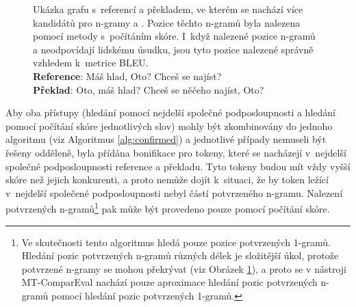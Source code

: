 \begin{figure}[h!]

	\caption{
		Ukázka grafu s~referencí a překladem, ve kterém se nachází více kandidátů pro \mbox{n-gramy}  a \uv{,}.
		Pozice těchto \mbox{n-gramů} byla nalezena pomocí metody s~počítáním skóre.
		I~když nalezené pozice \mbox{n-gramů}  a \uv{,} neodpovídají lidskému úsudku,
		jsou tyto pozice nalezené správně vzhledem k~metrice BLEU. \\
		\textbf{Reference}: Máš hlad, Oto? Chceš se najíst?\\
		\textbf{Překlad}: Oto, máš hlad? Chceš se něčeho najíst, Oto?
	}
	\label{img:graph-6}
\end{figure}
  
Aby oba přístupy (hledání pomocí nejdelší společné podposloupnosti a hledání pomocí počítání skóre jednotlivých slov) mohly být zkombinovány do jednoho algoritmu (viz Algoritmus \ref{alg:confirmed}) a
  jednotlivé případy nemuseli být řešeny odděleně,
  byla přídána bonifikace pro tokeny,
  které se nacházejí v~nejdelší společné podposloupnosti reference a překladu.
Tyto tokeny budou mít vždy vyšší skóre než jejich konkurenti,
  a proto nemůže dojít k~situaci,
  že by token ležící v~nejdelší společené podposloupnosti nebyl částí potvrzeného \mbox{n-gramu}.
Nalezení potvrzených \mbox{n-gramů}\footnote{
  Ve skutečnosti tento algoritmus hledá pouze pozice potvrzených \mbox{1-gramů}.
  Hledání pozic potvrzených \mbox{n-gramů} různých délek je složitější úkol, protože potvrzené n-gramy se mohou překrývat (viz Obrázek \ref{img:graph-6}),
  a proto se v nástroji \mbox{MT-ComparEval} nachází pouze aproximace hledání pozic potvrzených \mbox{n-gramů} pomocí hledání pozic potvrzených \mbox{1-gramů}.
  }
  pak může být provedeno pouze pomocí počítání skóre.



